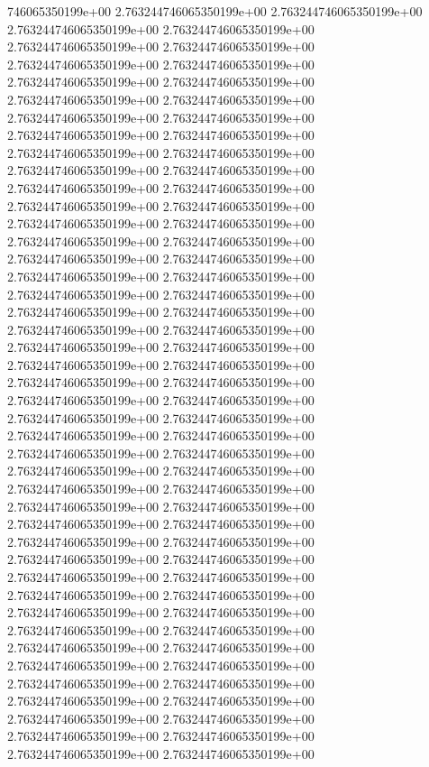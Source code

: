 746065350199e+00	2.763244746065350199e+00	2.763244746065350199e+00	2.763244746065350199e+00	2.763244746065350199e+00	2.763244746065350199e+00	2.763244746065350199e+00	2.763244746065350199e+00	2.763244746065350199e+00	2.763244746065350199e+00	2.763244746065350199e+00	2.763244746065350199e+00	2.763244746065350199e+00	2.763244746065350199e+00	2.763244746065350199e+00	2.763244746065350199e+00	2.763244746065350199e+00	2.763244746065350199e+00	2.763244746065350199e+00	2.763244746065350199e+00	2.763244746065350199e+00	2.763244746065350199e+00	2.763244746065350199e+00	2.763244746065350199e+00	2.763244746065350199e+00	2.763244746065350199e+00	2.763244746065350199e+00	2.763244746065350199e+00	2.763244746065350199e+00	2.763244746065350199e+00	2.763244746065350199e+00	2.763244746065350199e+00	2.763244746065350199e+00	2.763244746065350199e+00	2.763244746065350199e+00	2.763244746065350199e+00	2.763244746065350199e+00	2.763244746065350199e+00	2.763244746065350199e+00	2.763244746065350199e+00	2.763244746065350199e+00	2.763244746065350199e+00	2.763244746065350199e+00	2.763244746065350199e+00	2.763244746065350199e+00	2.763244746065350199e+00	2.763244746065350199e+00	2.763244746065350199e+00	2.763244746065350199e+00	2.763244746065350199e+00	2.763244746065350199e+00	2.763244746065350199e+00	2.763244746065350199e+00	2.763244746065350199e+00	2.763244746065350199e+00	2.763244746065350199e+00	2.763244746065350199e+00	2.763244746065350199e+00	2.763244746065350199e+00	2.763244746065350199e+00	2.763244746065350199e+00	2.763244746065350199e+00	2.763244746065350199e+00	2.763244746065350199e+00	2.763244746065350199e+00	2.763244746065350199e+00	2.763244746065350199e+00	2.763244746065350199e+00	2.763244746065350199e+00	2.763244746065350199e+00	2.763244746065350199e+00	2.763244746065350199e+00	2.763244746065350199e+00	2.763244746065350199e+00	2.763244746065350199e+00	2.763244746065350199e+00	2.763244746065350199e+00	2.763244746065350199e+00	2.763244746065350199e+00	2.763244746065350199e+00	2.763244746065350199e+00	2.763244746065350199e+00	2.763244746065350199e+00	2.763244746065350199e+00	2.763244746065350199e+00	2.763244746065350199e+00	2.763244746065350199e+00
